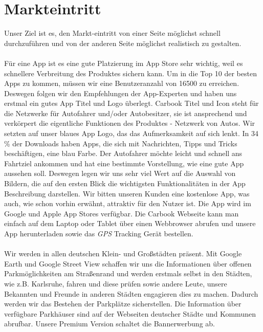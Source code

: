 \documentclass[12pt,ngerman, fleqn]{book} %
\begin{document}
\section{Markteintritt}
Unser Ziel ist es, den Markt-eintritt von einer Seite möglichst schnell durchzuführen und von der anderen Seite möglichst realistisch zu gestalten. \\ \\
Für eine App ist es eine gute Platzierung im App Store sehr wichtig, weil es schnellere Verbreitung des Produktes sichern kann. Um in die Top 10 der besten Apps zu kommen, müssen wir eine Benutzeranzahl von 16500 zu erreichen\autocite{statista5}. Deswegen folgen wir den Empfehlungen der App-Experten und haben uns erstmal ein gutes App Titel und Logo überlegt. Carbook Titel und Icon steht für die Netzwerke für Autofahrer und/oder Autobesitzer, sie ist ansprechend und verkörpert die eigentliche Funktionen des Produktes - Netzwerk von Autos. Wir setzten auf unser blaues App Logo, das das Aufmerksamkeit auf sich lenkt. In 34 \% der  Downloads haben Apps, die sich mit Nachrichten, Tipps und Tricks beschäftigen, eine blau Farbe\autocite{iphonetricks}.  Der Autofahrer möchte leicht und schnell ans Fahrtziel ankommen und hat eine bestimmte Vorstellung, wie eine gute App aussehen soll. Deswegen legen wir uns sehr viel Wert auf die Auswahl von Bildern, die auf den ersten Blick die wichtigsten Funktionalitäten in der App Beschreibung darstellen. Wir bitten unseren Kunden eine kostenlose App, was auch, wie schon vorhin erwähnt, attraktiv für den Nutzer ist. Die App wird im Google und Apple App Stores verfügbar. Die Carbook Webseite kann man einfach auf dem Laptop oder Tablet über einen Webbrowser abrufen und unsere App herunterladen sowie das \emph{GPS} Tracking Gerät bestellen.\\ \\
Wir werden in allen deutschen Klein- und Großstädten präsent. Mit Google Earth und Google Street View schaffen wir uns die Informationen über offenen Parkmöglichkeiten am Straßenrand und werden erstmals selbst in den Städten, wie z.B. Karlsruhe, fahren und diese prüfen sowie andere Leute, unsere Bekannten und Freunde in anderen Städten engagieren dies zu machen.  Dadurch werden wir das Bestehen der Parkplätze sicherstellen. Die Information über verfügbare Parkhäuser sind auf der Webseiten deutscher Städte und Kommunen abrufbar. Unsere Premium Version schaltet die Bannerwerbung ab. \\ \\
\end{document}
